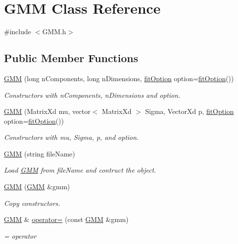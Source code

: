 \hypertarget{class_g_m_m}{\section{G\+M\+M Class Reference}
\label{class_g_m_m}
}


{\ttfamily \#include $<$G\+M\+M.\+h$>$}

\subsection*{Public Member Functions}
\begin{DoxyCompactItemize}
\item 
\hyperlink{class_g_m_m_a780eb798b963d64324e60f8a05511793}{G\+M\+M} (long n\+Components, long n\+Dimensions, \hyperlink{structfit_option}{fit\+Option} option=\hyperlink{structfit_option}{fit\+Option}())
\begin{DoxyCompactList}\small\item\em Constructors with n\+Components, n\+Dimensions and option. \end{DoxyCompactList}\item 
\hyperlink{class_g_m_m_a204c0939ce8e0544a70f6bacac70430e}{G\+M\+M} (Matrix\+Xd mu, vector$<$ Matrix\+Xd $>$ Sigma, Vector\+Xd p, \hyperlink{structfit_option}{fit\+Option} option=\hyperlink{structfit_option}{fit\+Option}())
\begin{DoxyCompactList}\small\item\em Constructors with mu, Sigma, p, and option. \end{DoxyCompactList}\item 
\hyperlink{class_g_m_m_a3fd2ad1e4b02532fbcc8c268f60b4ee8}{G\+M\+M} (string file\+Name)
\begin{DoxyCompactList}\small\item\em Load \hyperlink{class_g_m_m}{G\+M\+M} from file\+Name and contruct the object. \end{DoxyCompactList}\item 
\hyperlink{class_g_m_m_ae4a3fdfee01a1f37a58d405b701f1469}{G\+M\+M} (\hyperlink{class_g_m_m}{G\+M\+M} \&gmm)
\begin{DoxyCompactList}\small\item\em Copy constructors. \end{DoxyCompactList}\item 
\hyperlink{class_g_m_m}{G\+M\+M} \& \hyperlink{class_g_m_m_a60cc7218be23fa401a804b5d419632b9}{operator=} (const \hyperlink{class_g_m_m}{G\+M\+M} \&gmm)
\begin{DoxyCompactList}\small\item\em = operator \end{DoxyCompactList}\item 

\end{DoxyCompactItemize}
